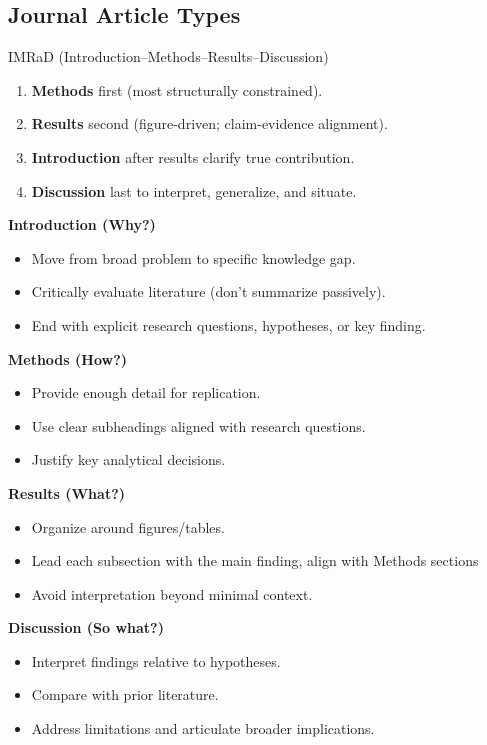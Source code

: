 \documentclass{beamer}
\begin{document}
\subsection{Journal Article Types}

\begin{frame}{IMRaD (Introduction–Methods–Results–Discussion)}
    \fontsize{9pt}{10pt}\selectfont

\begin{enumerate}
    \item \textbf{Methods} first (most structurally constrained).
    \item \textbf{Results} second (figure-driven; claim-evidence alignment).
    \item \textbf{Introduction} after results clarify true contribution.
    \item \textbf{Discussion} last to interpret, generalize, and situate.
\end{enumerate}

\vspace{0.4em}

\textbf{Introduction (Why?)}
\begin{itemize}
    \item Move from broad problem to specific knowledge gap.
    \item Critically evaluate literature (don't summarize passively).
    \item End with explicit research questions, hypotheses, or key finding.
\end{itemize}

\textbf{Methods (How?)}
\begin{itemize}
    \item Provide enough detail for replication.
    \item Use clear subheadings aligned with research questions.
    \item Justify key analytical decisions.
\end{itemize}

\textbf{Results (What?)}
\begin{itemize}
    \item Organize around figures/tables.
    \item Lead each subsection with the main finding, align with Methods sections
    \item Avoid interpretation beyond minimal context.
\end{itemize}

\textbf{Discussion (So what?)}
\begin{itemize}
    \item Interpret findings relative to hypotheses.
    \item Compare with prior literature.
    \item Address limitations and articulate broader implications.
\end{itemize}

\end{frame}
\end{document}
